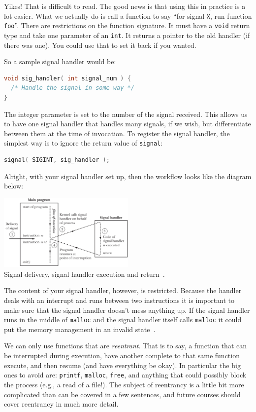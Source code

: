 \documentclass[a4paper]{report}
\begin{document}
Yikes! That is difficult to read. The good news is that using this in practice is a lot easier. What we actually do is call a function to say ``for signal \texttt{X}, run function \texttt{foo}''. There are restrictions on the function signature. It must have a \texttt{void} return type and take one parameter of an \texttt{int}. It returns a pointer to the old handler (if there was one). You could use that to set it back if you wanted.

So a sample signal handler would be:
\begin{lstlisting}[language=C]
void sig_handler( int signal_num ) {
  /* Handle the signal in some way */
}
\end{lstlisting}

The integer parameter is set to the number of the signal received. This allows us to have one signal handler that handles many signals, if we wish, but differentiate between them at the time of invocation. To register the signal handler, the simplest way is to ignore the return value of \texttt{signal}:

\begin{lstlisting}[language=C]
signal( SIGINT, sig_handler );
\end{lstlisting}

Alright, with your signal handler set up, then the workflow looks like the diagram below:

\begin{center}
	\includegraphics[width=0.5\textwidth]{images/sighandler.png}\\
	Signal delivery, signal handler execution and return~\cite{lpi}.
\end{center}

The content of your signal handler, however, is restricted. Because the handler deals with an interrupt and runs between two instructions it is important to make sure that the signal handler doesn't mess anything up. If the signal handler runs in the middle of \texttt{malloc} and the signal handler itself calls \texttt{malloc} it could put the memory management in an invalid state~\cite{apunix}.

We can only use functions that are \textit{reentrant}. That is to say, a function that can be interrupted during execution, have another complete to that same function execute, and then resume (and have everything be okay). In particular the big ones to avoid are: \texttt{printf}, \texttt{malloc}, \texttt{free}, and anything that could possibly block the process (e.g., a read of a file!). The subject of reentrancy is a little bit more complicated than can be covered in a few sentences, and future courses should cover reentrancy in much more detail.
\end{document}
